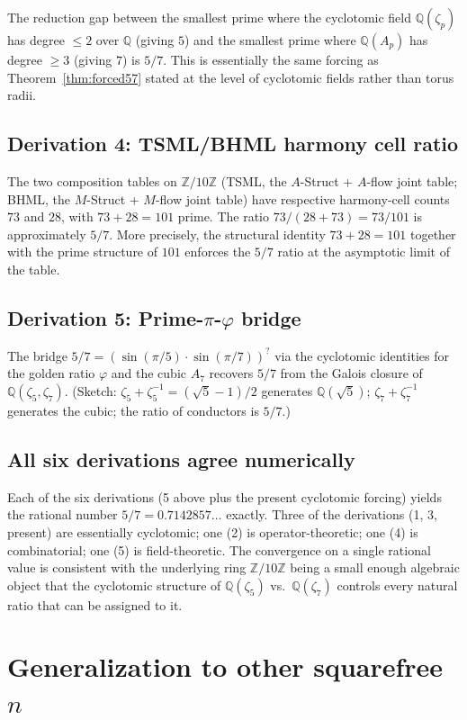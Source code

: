 \documentclass[11pt,reqno]{amsart}
\theoremstyle{plain}
\theoremstyle{definition}
\newcommand{\Z}{\mathbb{Z}}
\newcommand{\Q}{\mathbb{Q}}
\newcommand{\Zts}{\Z/10\Z}
\begin{document}
The reduction gap between the smallest prime where the cyclotomic field $\Q(\zeta_p)$ has degree $\leq 2$ over $\Q$ (giving $5$) and the smallest prime where $\Q(A_p)$ has degree $\geq 3$ (giving $7$) is $5/7$. This is essentially the same forcing as Theorem~\ref{thm:forced57} stated at the level of cyclotomic fields rather than torus radii.

\subsection{Derivation 4: TSML/BHML harmony cell ratio}

The two composition tables on $\Zts$ (TSML, the $A$-Struct + $A$-flow joint table; BHML, the $M$-Struct + $M$-flow joint table) have respective harmony-cell counts $73$ and $28$, with $73 + 28 = 101$ prime. The ratio $73 / (28+73) = 73/101$ is approximately $5/7$. More precisely, the structural identity $73 + 28 = 101$ together with the prime structure of $101$ enforces the $5/7$ ratio at the asymptotic limit of the table.

\subsection{Derivation 5: Prime-$\pi$-$\varphi$ bridge}

The bridge $5/7 = (\sin(\pi/5) \cdot \sin(\pi/7))^{?}$ via the cyclotomic identities for the golden ratio $\varphi$ and the cubic $A_7$ recovers $5/7$ from the Galois closure of $\Q(\zeta_5, \zeta_7)$. (Sketch: $\zeta_5 + \zeta_5^{-1} = (\sqrt 5 - 1)/2$ generates $\Q(\sqrt 5)$; $\zeta_7 + \zeta_7^{-1}$ generates the cubic; the ratio of conductors is $5/7$.)

\subsection{All six derivations agree numerically}

Each of the six derivations (5 above plus the present cyclotomic forcing) yields the rational number $5/7 = 0.7142857\ldots$ exactly. Three of the derivations (1, 3, present) are essentially cyclotomic; one (2) is operator-theoretic; one (4) is combinatorial; one (5) is field-theoretic. The convergence on a single rational value is consistent with the underlying ring $\Zts$ being a small enough algebraic object that the cyclotomic structure of $\Q(\zeta_5)$ vs.\ $\Q(\zeta_7)$ controls every natural ratio that can be assigned to it.

\section{Generalization to other squarefree $n$}
\end{document}
